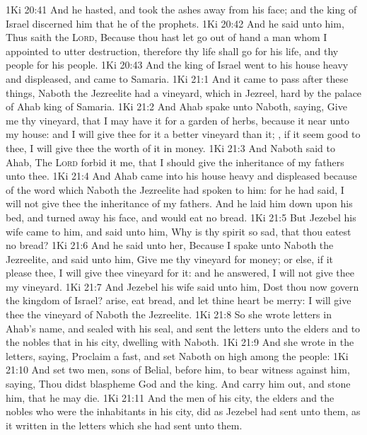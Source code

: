 \vs 1Ki 20:41 And he hasted, and took the ashes away from his face; and the king of Israel discerned him that he  of the prophets.
\vs 1Ki 20:42 And he said unto him, Thus saith the \textsc{Lord}, Because thou hast let go out of  hand a man whom I appointed to utter destruction, therefore thy life shall go for his life, and thy people for his people.
\vs 1Ki 20:43 And the king of Israel went to his house heavy and displeased, and came to Samaria.
\vs 1Ki 21:1 And it came to pass after these things,  Naboth the Jezreelite had a vineyard, which  in Jezreel, hard by the palace of Ahab king of Samaria.
\vs 1Ki 21:2 And Ahab spake unto Naboth, saying, Give me thy vineyard, that I may have it for a garden of herbs, because it  near unto my house: and I will give thee for it a better vineyard than it; , if it seem good to thee, I will give thee the worth of it in money.
\vs 1Ki 21:3 And Naboth said to Ahab, The \textsc{Lord} forbid it me, that I should give the inheritance of my fathers unto thee.
\vs 1Ki 21:4 And Ahab came into his house heavy and displeased because of the word which Naboth the Jezreelite had spoken to him: for he had said, I will not give thee the inheritance of my fathers. And he laid him down upon his bed, and turned away his face, and would eat no bread.
\vs 1Ki 21:5 But Jezebel his wife came to him, and said unto him, Why is thy spirit so sad, that thou eatest no bread?
\vs 1Ki 21:6 And he said unto her, Because I spake unto Naboth the Jezreelite, and said unto him, Give me thy vineyard for money; or else, if it please thee, I will give thee  vineyard for it: and he answered, I will not give thee my vineyard.
\vs 1Ki 21:7 And Jezebel his wife said unto him, Dost thou now govern the kingdom of Israel? arise,  eat bread, and let thine heart be merry: I will give thee the vineyard of Naboth the Jezreelite.
\vs 1Ki 21:8 So she wrote letters in Ahab's name, and sealed  with his seal, and sent the letters unto the elders and to the nobles that  in his city, dwelling with Naboth.
\vs 1Ki 21:9 And she wrote in the letters, saying, Proclaim a fast, and set Naboth on high among the people:
\vs 1Ki 21:10 And set two men, sons of Belial, before him, to bear witness against him, saying, Thou didst blaspheme God and the king. And  carry him out, and stone him, that he may die.
\vs 1Ki 21:11 And the men of his city,  the elders and the nobles who were the inhabitants in his city, did as Jezebel had sent unto them,  as it  written in the letters which she had sent unto them.
